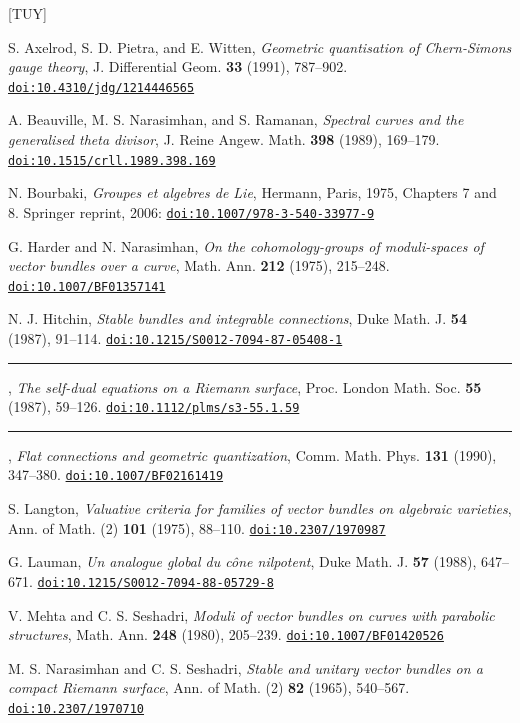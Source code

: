 \documentclass[12pt,english]{smfart}
\theoremstyle{plain} \newtheorem{innerthm}{Theorem} \newtheorem{innerlem}{Lemma} \newtheorem{innerprop}{Proposition} \newtheorem{innercor}{Corollary} \theoremstyle{definition} \newtheorem{innerdefn}{Definition} \newtheorem{innerconstr}{Construction} \theoremstyle{remark} \newtheorem*{remark}{Remark} \newtheorem*{remarks}{Remarks} \newtheorem*{applications}{Applications}
\newcommand{\doi}[1]{{\footnotesize\href{https://doi.org/#1}{\texttt{doi:#1}}}} \newcommand{\doix}[2]{{\footnotesize #1: \href{https://doi.org/#2}{\texttt{doi:#2}}}} \newcommand{\mr}[1]{{\footnotesize\href{https://mathscinet.ams.org/mathscinet-getitem?mr=#1}{\texttt{MR\,#1}}}} \newcommand{\zbl}[1]{{\footnotesize\href{https://zbmath.org/?q=an\%3A#1}{\texttt{Zbl\,#1}}}}
\begin{document}

{}
\begin{thebibliography}{[TUY]}

 S. Axelrod, S. D. Pietra, and E. Witten,
\emph{Geometric quantisation of Chern-Simons gauge theory}, J. Differential Geom. \textbf{33} (1991), 787--902.
\doi{10.4310/jdg/1214446565}

 A. Beauville, M. S. Narasimhan, and S. Ramanan,
\emph{Spectral curves and the generalised theta divisor}, J. Reine Angew. Math. \textbf{398} (1989), 169--179.
\doi{10.1515/crll.1989.398.169}

 N. Bourbaki, \emph{Groupes et algebres de Lie},
Hermann, Paris, 1975, Chapters 7 and 8.
\doix{Springer reprint, 2006}{10.1007/978-3-540-33977-9}

 G. Harder and N. Narasimhan,
\emph{On the cohomology-groups of moduli-spaces of vector bundles over a curve}, Math. Ann. \textbf{212} (1975), 215--248.
\doi{10.1007/BF01357141}

 N. J. Hitchin, \emph{Stable bundles and integrable
connections}, Duke Math. J. \textbf{54} (1987), 91--114.
\doi{10.1215/S0012-7094-87-05408-1}

 \rule{2em}{0.4pt}, \emph{The self-dual equations on a
Riemann surface}, Proc. London Math. Soc. \textbf{55} (1987), 59--126.
\doi{10.1112/plms/s3-55.1.59}

 \rule{2em}{0.4pt}, \emph{Flat connections and geometric
quantization}, Comm. Math. Phys. \textbf{131} (1990), 347--380.
\doi{10.1007/BF02161419}

 S. Langton, \emph{Valuative criteria for families of vector
bundles on algebraic varieties}, Ann. of Math. (2) \textbf{101} (1975), 88--110.
\doi{10.2307/1970987}

 G. Lauman, \emph{Un analogue global du c\^one nilpotent},
Duke Math. J. \textbf{57} (1988), 647--671.
\doi{10.1215/S0012-7094-88-05729-8}

 V. Mehta and C. S. Seshadri, \emph{Moduli of vector bundles
on curves with parabolic structures}, Math. Ann. \textbf{248} (1980), 205--239.
\doi{10.1007/BF01420526}

 M. S. Narasimhan and C. S. Seshadri, \emph{Stable and
unitary vector bundles on a compact Riemann surface}, Ann. of Math. (2) \textbf{82} (1965), 540--567.
\doi{10.2307/1970710}


\end{thebibliography}
\end{document}
